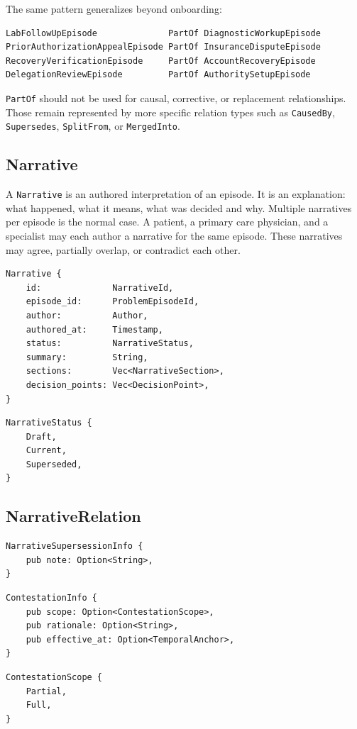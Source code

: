 \documentclass[11pt]{article}
\begin{document}
The same pattern generalizes beyond onboarding:

\begin{lstlisting}
LabFollowUpEpisode              PartOf DiagnosticWorkupEpisode
PriorAuthorizationAppealEpisode PartOf InsuranceDisputeEpisode
RecoveryVerificationEpisode     PartOf AccountRecoveryEpisode
DelegationReviewEpisode         PartOf AuthoritySetupEpisode
\end{lstlisting}

\texttt{PartOf} should not be used for causal, corrective, or replacement relationships. Those remain represented by more specific relation types such as \texttt{CausedBy}, \texttt{Supersedes}, \texttt{SplitFrom}, or \texttt{MergedInto}.
\subsection{Narrative}

A \texttt{Narrative} is an authored interpretation of an episode. It is an
explanation: what happened, what it means, what was decided and why. Multiple
narratives per episode is the normal case. A patient, a primary care
physician, and a specialist may each author a narrative for the same episode.
These narratives may agree, partially overlap, or contradict each other.

\begin{lstlisting}
Narrative {
    id:              NarrativeId,
    episode_id:      ProblemEpisodeId,
    author:          Author,
    authored_at:     Timestamp,
    status:          NarrativeStatus,
    summary:         String,
    sections:        Vec<NarrativeSection>,
    decision_points: Vec<DecisionPoint>,
}
\end{lstlisting}

\begin{lstlisting}
NarrativeStatus {
    Draft,
    Current,
    Superseded,
}
\end{lstlisting}



\subsection{NarrativeRelation}

\begin{lstlisting}
NarrativeSupersessionInfo {
    pub note: Option<String>,
}
\end{lstlisting}

\begin{lstlisting}
ContestationInfo {
    pub scope: Option<ContestationScope>,
    pub rationale: Option<String>,
    pub effective_at: Option<TemporalAnchor>,
}
\end{lstlisting}
\begin{lstlisting}
ContestationScope {
    Partial,
    Full,
}
\end{lstlisting}
\end{document}
